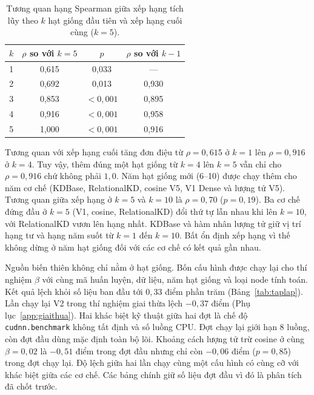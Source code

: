 \begin{table}[!htbp]
\centering
\caption{Tương quan hạng Spearman giữa xếp hạng tích lũy theo $k$ hạt
giống đầu tiên và xếp hạng cuối cùng ($k=5$).}
\label{tab:hoitu}
\begin{tabular}{cccc}
\toprule
$k$ & $\rho$ so với $k=5$ & $p$ & $\rho$ so với $k-1$ \\
\midrule
1 & 0,615 & 0,033 & --- \\
2 & 0,692 & 0,013 & 0,930 \\
3 & 0,853 & $<0{,}001$ & 0,895 \\
4 & 0,916 & $<0{,}001$ & 0,958 \\
5 & 1,000 & $<0{,}001$ & 0,916 \\
\bottomrule
\end{tabular}
\end{table}
\FloatBarrier

Tương quan với xếp hạng cuối tăng đơn điệu từ $\rho=0{,}615$ ở $k=1$ lên
$\rho=0{,}916$ ở $k=4$. Tuy vậy, thêm đúng một hạt giống từ $k=4$ lên
$k=5$ vẫn chỉ cho $\rho=0{,}916$ chứ không phải $1{,}0$. Năm hạt giống mới
(6--10) được chạy thêm cho năm cơ chế (KDBase, RelationalKD, cosine V5, V1
Dense và lượng tử V5). Tương quan giữa xếp hạng ở $k=5$ và $k=10$ là
$\rho=0{,}70$ ($p=0{,}19$). Ba cơ chế đứng đầu ở $k=5$ (V1, cosine,
RelationalKD) đổi thứ tự lẫn nhau khi lên $k=10$, với RelationalKD vươn lên
hạng nhất. KDBase và hàm nhân lượng tử giữ vị trí hạng tư và hạng năm suốt
từ $k=1$ đến $k=10$. Bất ổn định xếp hạng vì thế không dừng ở năm hạt giống
đối với các cơ chế có kết quả gần nhau.

Nguồn biến thiên không chỉ nằm ở hạt giống. Bốn cấu hình được chạy lại cho thí nghiệm $\beta$ với cùng mã huấn luyện,
dữ liệu, năm hạt giống và loại node tính toán. Kết quả lệch khỏi số liệu ban
đầu tới $0{,}33$ điểm phần trăm (Bảng~\ref{tab:taplap}). Lần chạy lại V2 trong thí
nghiệm giai thừa lệch $-0{,}37$ điểm (Phụ lục~\ref{app:giaithua}). Hai khác biệt kỹ thuật
giữa hai đợt là chế độ \texttt{cudnn.benchmark} không tất định và số luồng CPU. Đợt chạy lại giới hạn 8 luồng, còn đợt đầu dùng mặc định toàn
bộ lõi.
Khoảng cách lượng tử trừ cosine ở cùng $\beta = 0{,}02$ là $-0{,}51$ điểm
trong đợt đầu nhưng chỉ còn $-0{,}06$ điểm ($p = 0{,}85$) trong đợt chạy
lại. Độ lệch giữa hai lần chạy cùng một cấu hình có cùng cỡ với khác biệt giữa các cơ chế. Các bảng chính giữ số liệu đợt đầu vì đó là phân tích
đã chốt trước.

